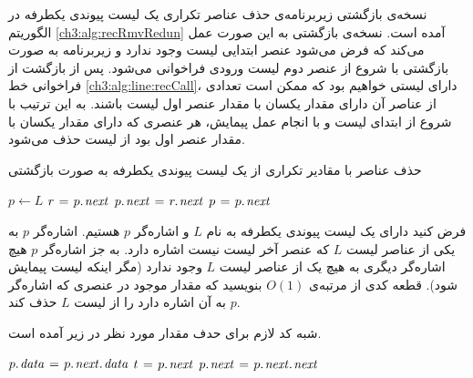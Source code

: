 نسخه‌ی بازگشتی زیربرنامه‌ی حذف عناصر تکراری یک لیست پیوندی یکطرفه در الگوریتم {\ref{ch3:alg:recRmvRedun}} آمده است. نسخه‌ی بازگشتی به این صورت عمل می‌کند که فرض می‌شود عنصر ابتدایی لیست وجود ندارد و زیربرنامه به صورت بازگشتی با شروع از عنصر دوم لیست ورودی فراخوانی می‌شود. پس از بازگشت از فراخوانی خط {\ref{ch3:alg:line:recCall}}، دارای لیستی خواهیم بود که ممکن است تعدادی از عناصر آن دارای مقدار یکسان با مقدار عنصر اول لیست باشند. به این ترتیب با شروع از ابتدای لیست و با انجام عمل پیمایش، هر عنصری که دارای مقدار یکسان با مقدار عنصر اول بود از لیست حذف می‌شود.
\begin{algorithm}
\caption{حذف عناصر با مقادیر تکراری از یک لیست پیوندی یکطرفه به صورت بازگشتی}\label{ch3:alg:recRmvRedun}
\begin{latin}
\begin{algorithmic}[1]
				\State	\Return
		\EndIf
		\State	{}\label{ch3:alg:line:recCall}
		\State	$p \gets L$
						\State	$r \mathrel{\hspace{1pt}=\hspace{1pt}} p.\hspace*{1pt}\mathit{next}$
						\State	$p.\hspace*{1pt}\mathit{next} \mathrel{\hspace{1pt}=\hspace{1pt}} r.\hspace*{1pt}\mathit{next}$
						\State	{}
				\Else
						\State	$p \mathrel{\hspace{1pt}=\hspace{1pt}} p.\hspace*{1pt}\mathit{next}$
				\EndIf
		\EndWhile			
\EndProcedure
\end{algorithmic}
\end{latin}
\end{algorithm}

 فرض کنید دارای یک لیست پیوندی یکطرفه به نام {$L$} و اشاره‌گر {$p$} هستیم. اشاره‌گر {$p$} به یکی از عناصر لیست {$L$} که عنصر آخر لیست نیست اشاره دارد. به جز اشاره‌گر {$p$} هیچ اشاره‌گر دیگری به هیچ یک از عناصر لیست {$L$} وجود ندارد (مگر اینکه لیست پیمایش شود). قطعه کدی از مرتبه‌ی {$O(1)$} بنویسید که مقدار موجود در عنصری که اشاره‌گر {$p$} به آن اشاره دارد را از لیست {$L$} حذف کند.


شبه کد لازم برای حدف مقدار مورد نظر در زیر آمده است.
\begin{latin}
\begin{algorithmic}[1]
		\State	$p.\hspace*{1pt}\mathit{data} \mathrel{\hspace{1pt}=\hspace{1pt}} p.\hspace*{1pt}\mathit{next}.\hspace*{1pt}\mathit{data}$
		\State	$t \mathrel{\hspace{1pt}=\hspace{1pt}} p.\hspace*{1pt}\mathit{next}$
		\State	$p.\hspace*{1pt}\mathit{next} \mathrel{\hspace{1pt}=\hspace{1pt}} p.\hspace*{1pt}\mathit{next}.\hspace*{1pt}\mathit{next}$
		\State	{}
\end{algorithmic}
\end{latin}

